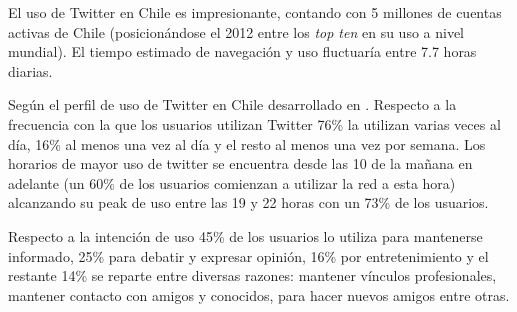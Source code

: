 El uso de Twitter en Chile es impresionante, contando con 5 millones de cuentas activas de Chile (posicionándose el 2012 entre los \emph{top ten} en su uso a nivel mundial). El tiempo estimado de navegación y uso fluctuaría entre 7.7 horas diarias. \cite{rankingChileSemiocast}

Según el perfil de uso de Twitter en Chile desarrollado en \cite{udpperfiluso}. Respecto a la frecuencia con la que los usuarios utilizan Twitter 76\% la utilizan varias veces al día, 16\% al menos una vez al día y el resto al menos una vez por semana. Los horarios de mayor uso de twitter se encuentra desde las 10 de la mañana en adelante (un 60\% de los usuarios comienzan a utilizar la red a esta hora) alcanzando su peak de uso entre las 19 y 22 horas con un 73\% de los usuarios.

Respecto a la intención de uso 45\% de los usuarios lo utiliza para mantenerse informado, 25\% para debatir y expresar opinión, 16\% por entretenimiento y el restante 14\% se reparte entre diversas razones: mantener vínculos profesionales, mantener contacto con amigos y conocidos, para hacer nuevos amigos entre otras.